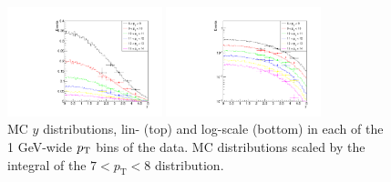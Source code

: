 \documentclass{article}
\begin{document}
\clearpage

\begin{figure}[h!]
\centering
\includegraphics[width = 0.4\textwidth]{plots/y_dist.pdf}

\includegraphics[width = 0.4\textwidth]{plots/y_dist_log.pdf}
\caption{MC $y$ distributions, lin- (top) and log-scale (bottom) in each of the 1 GeV-wide $p_\text T$ bins of the data. MC distributions scaled by the integral of the $7<p_\text{T}<8$ distribution.}\label{f:y_comp_rho_log}
\end{figure}
\end{document}
